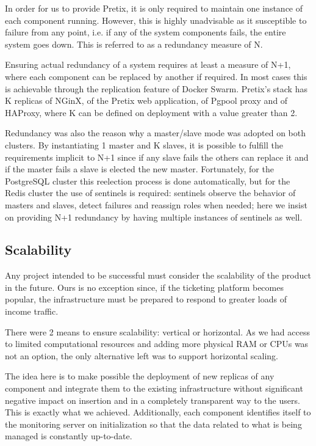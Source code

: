 \documentclass[12pt]{article}
\begin{document}
In order for us to provide Pretix, it is only required to maintain one instance of each component running.
However, this is highly unadvisable as it susceptible to failure from any point, i.e. if any of the system components fails, the entire system goes down.
This is referred to as a redundancy measure of N.

Ensuring actual redundancy of a system requires at least a measure of N+1, where each component can be replaced by another if required.
In most cases this is achievable through the replication feature of Docker Swarm.
Pretix's stack has K replicas of NGinX, of the Pretix web application, of Pgpool proxy and of HAProxy, where K can be defined on deployment with a value greater than 2.

Redundancy was also the reason why a master/slave mode was adopted on both clusters.
By instantiating 1 master and K slaves, it is possible to fulfill the requirements implicit to N+1 since if any slave fails the others can replace it and if the
master fails a slave is elected the new master.
Fortunately, for the PostgreSQL cluster this reelection process is done automatically, but for the Redis cluster the use of sentinels is required: sentinels
observe the behavior of masters and slaves, detect failures and reassign roles when needed; here we insist on providing N+1 redundancy by having multiple
instances of sentinels as well.

\subsection{Scalability} \label{architecture.scalability} %


Any project intended to be successful must consider the scalability of the product in the future.
Ours is no exception since, if the ticketing platform becomes popular, the infrastructure must be prepared to respond to greater loads of income traffic.

There were 2 means to ensure scalability: vertical or horizontal.
As we had access to limited computational resources and adding more physical RAM or CPUs was not an option, the only alternative left was to support horizontal scaling.

The idea here is to make possible the deployment of new replicas of any component and integrate them to the existing infrastructure without significant negative
impact on insertion and in a completely transparent way to the users.
This is exactly what we achieved.
Additionally, each component identifies itself to the monitoring server on initialization so that the data related to what is being managed is constantly up-to-date.
\end{document}
